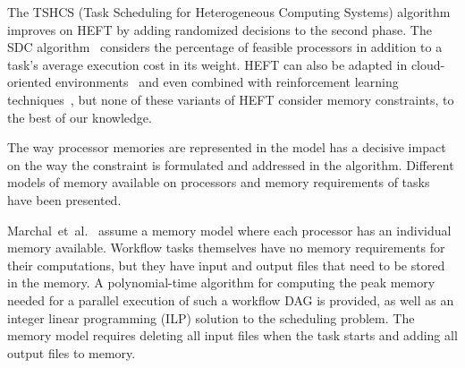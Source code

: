 \documentclass[conference]{IEEEtran}
\newcommand{\new}[1]{{\color{blue}#1}}
\begin{document}
The TSHCS (Task Scheduling for Heterogeneous Computing Systems) algorithm~\cite{alebrahim2017task} 
improves on HEFT by adding randomized decisions to the second phase.
The SDC algorithm~\cite{SHI2006665} considers the percentage of feasible processors in addition to a task’s
average execution cost in its weight.
HEFT  can also be adapted in cloud-oriented environments~\cite{samadi2018eheft} and even combined with reinforcement learning techniques~\cite{yano2022cqga}, but none of these variants of HEFT consider memory constraints, 
to the best of our knowledge. 

\medskip
{}
%
The way processor memories are represented in the model has a decisive impact on the way the constraint
is formulated and addressed in the algorithm.
%
Different models of memory available on processors and memory requirements of tasks have been presented.

Marchal~et~al.~\cite{marchal2018parallel} assume a memory model where each processor has an individual memory available.
\new{Workflow tasks themselves have no memory requirements for their computations,
but they have input and output files that need to be stored in the memory.}
A polynomial-time algorithm for computing the peak memory needed for a parallel execution of such a workflow DAG is provided,
as well as an integer linear programming (ILP) solution to the scheduling problem.
The memory model \new{requires deleting all input files when the task starts and adding all output files to memory.}
\end{document}
